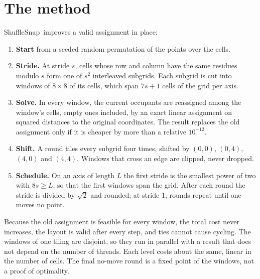 \documentclass[11pt]{article}
\newcommand{\ShuffleSnap}{ShuffleSnap}
\begin{document}
\clearpage

\section{The method}

\ShuffleSnap\ improves a valid assignment in place:
\begin{enumerate}
\item \textbf{Start} from a seeded random permutation of the points over the cells.
\item \textbf{Stride.} At stride $s$, cells whose row and column have the same residues
  modulo $s$ form one of $s^2$ interleaved subgrids. Each subgrid is cut into windows of
  $8\times8$ of its cells, which span $7s+1$ cells of the grid per axis.
\item \textbf{Solve.} In every window, the current occupants are reassigned among the
  window's cells, empty ones included, by an exact linear assignment on squared distances
  to the original coordinates. The result replaces the old assignment only if it is cheaper
  by more than a relative $10^{-12}$.
\item \textbf{Shift.} A round tiles every subgrid four times, shifted by $(0,0)$,
  $(0,4)$, $(4,0)$ and $(4,4)$. Windows that cross an edge are clipped, never dropped.
\item \textbf{Schedule.} On an axis of length $L$ the first stride is the smallest power
  of two with $8s\ge L$, so that the first windows span the grid. After each round the
  stride is divided by $\sqrt2$ and rounded; at stride 1, rounds repeat until one moves no
  point.
\end{enumerate}
Because the old assignment is feasible for every window, the total cost never increases,
the layout is valid after every step, and ties cannot cause cycling. The windows of one
tiling are disjoint, so they run in parallel with a result that does not depend on the
number of threads. Each level costs about the same, linear in the number of cells. The
final no-move round is a fixed point of the windows, not a proof of optimality.
\end{document}
